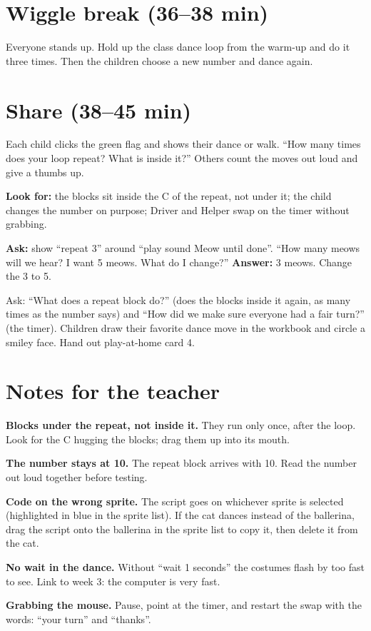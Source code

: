 \section{Wiggle break (36--38 min)}
Everyone stands up. Hold up the class dance loop from the warm-up and do it three times. Then the children choose a new number and dance again.

\section{Share (38--45 min)}
\begin{teacherscript}
Each child clicks the green flag and shows their dance or walk. \enquote{How many times does your loop repeat? What is inside it?} Others count the moves out loud and give a thumbs up.
\end{teacherscript}

\begin{formativecheck}
\textbf{Look for:} the blocks sit inside the C of the repeat, not under it; the child changes the number on purpose; Driver and Helper swap on the timer without grabbing.

\textbf{Ask:} show \enquote{repeat 3} around \enquote{play sound Meow until done}. \enquote{How many meows will we hear? I want 5 meows. What do I change?}
\textbf{Answer:} 3 meows. Change the 3 to 5.
\end{formativecheck}

\begin{reflection}
Ask: \enquote{What does a repeat block do?} (does the blocks inside it again, as many times as the number says) and \enquote{How did we make sure everyone had a fair turn?} (the timer). Children draw their favorite dance move in the workbook and circle a smiley face. Hand out play-at-home card 4.
\end{reflection}

\section{Notes for the teacher}
\begin{commonmistakes}
  \item \textbf{Blocks under the repeat, not inside it.} They run only once, after the loop. Look for the C hugging the blocks; drag them up into its mouth.
  \item \textbf{The number stays at 10.} The repeat block arrives with 10. Read the number out loud together before testing.
  \item \textbf{Code on the wrong sprite.} The script goes on whichever sprite is selected (highlighted in blue in the sprite list). If the cat dances instead of the ballerina, drag the script onto the ballerina in the sprite list to copy it, then delete it from the cat.
  \item \textbf{No wait in the dance.} Without \enquote{wait 1 seconds} the costumes flash by too fast to see. Link to week 3: the computer is very fast.
  \item \textbf{Grabbing the mouse.} Pause, point at the timer, and restart the swap with the words: \enquote{your turn} and \enquote{thanks}.
\end{commonmistakes}

